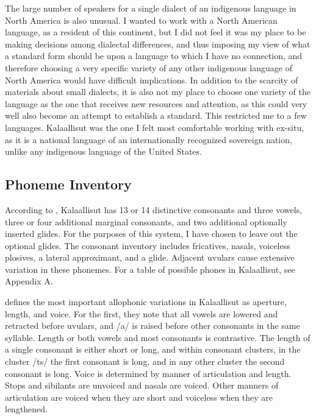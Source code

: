\documentclass[12pt]{article}
\begin{document}
The large number of speakers for a single dialect of an indigenous language in North America is also unusual. I wanted to work with a North American language, as a resident of this continent, but I did not feel it was my place to be making decisions among dialectal differences, and thus imposing my view of what a standard form should be upon a language to which I have no connection, and therefore choosing a very specific variety of any other indigenous language of North America would have difficult implications. In addition to the scarcity of materials about small dialects, it is also not my place to choose one variety of the language as the one that receives new resources and attention, as this could very well also become an attempt to establish a standard. This restricted me to a few languages. Kalaallisut was the one I felt most comfortable working with ex-situ, as it is a national language of an internationally recognized sovereign nation, unlike any indigenous language of the United States. \par

	\subsection{Phoneme Inventory}

	According to \citet{grammar}, Kalaallisut has 13 or 14 distinctive consonants and three vowels, three or four additional marginal consonants, and two additional optionally inserted glides. For the purposes of this system, I have chosen to leave out the optional glides. The consonant inventory includes fricatives, nasals, voiceless plosives, a lateral approximant, and a glide. Adjacent uvulars cause extensive variation in these phonemes. For a table of possible phones in Kalaallisut, see Appendix A. \par

	\citet{quan} defines the most important allophonic variations in Kalaallisut as aperture, length, and voice. For the first, they note that all vowels are lowered and retracted before uvulars, and /a/ is raised before other consonants in the same syllable. Length or both vowels and most consonants is contrastive. The length of a single consonant is either short or long, and within consonant clusters, in the cluster /ts/ the first consonant is long, and in any other cluster the second consonant is long. Voice is determined by manner of articulation and length. Stops and sibilants are unvoiced and nasals are voiced. Other manners of articulation are voiced when they are short and voiceless when they are lengthened. \par
\end{document}
